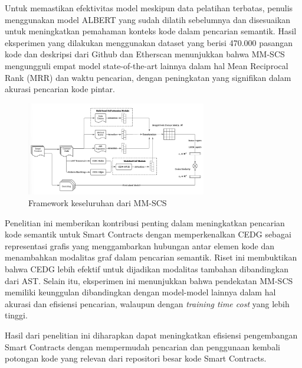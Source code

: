 Untuk memastikan efektivitas model meskipun data pelatihan terbatas, penulis menggunakan model ALBERT yang sudah dilatih sebelumnya dan disesuaikan untuk meningkatkan pemahaman konteks kode dalam pencarian semantik. Hasil eksperimen yang dilakukan menggunakan dataset yang berisi 470.000 pasangan kode dan deskripsi dari Github dan Etherscan menunjukkan bahwa MM-SCS mengungguli empat model state-of-the-art lainnya dalam hal Mean Reciprocal Rank (MRR) dan waktu pencarian, dengan peningkatan yang signifikan dalam akurasi pencarian kode pintar.

\begin{figure}[ht]
	\centering
	\includegraphics[width=0.7\textwidth]{resources/chapter-2/framework-mm-scs.png}
	\caption{Framework keseluruhan dari MM-SCS \parencite{shi2021semantic}}
	\label{image:framework-mm-scs}
\end{figure}

Penelitian ini memberikan kontribusi penting dalam meningkatkan pencarian kode semantik untuk Smart Contracts dengan memperkenalkan CEDG sebagai representasi grafis yang menggambarkan hubungan antar elemen kode dan menambahkan modalitas graf dalam pencarian semantik. Riset ini membuktikan bahwa CEDG lebih efektif untuk dijadikan modalitas tambahan dibandingkan dari AST. Selain itu, eksperimen ini menunjukkan bahwa pendekatan MM-SCS memiliki keunggulan dibandingkan dengan model-model lainnya dalam hal akurasi dan efisiensi pencarian, walaupun dengan \textit{training time cost} yang lebih tinggi.

Hasil dari penelitian ini diharapkan dapat meningkatkan efisiensi pengembangan Smart Contracts dengan mempermudah pencarian dan penggunaan kembali potongan kode yang relevan dari repositori besar kode Smart Contracts.